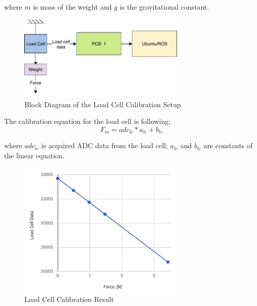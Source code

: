 	where $m$ is mass of the weight and $g$ is the gravitational constant.

\begin{figure}[h]
	\begin{center}
	\includegraphics[width=80mm]{fig/methods/Load_Cell_Calibration.pdf}
	\end{center}
	\vspace{-4mm}
	\caption[Block Diagram of the Load Cell Calibration Setup]
	{Block Diagram of the Load Cell Calibration Setup}
	\label{fig:Calib_setup_LC}
	\vspace{-2mm}
\end{figure}

	The calibration equation for the load cell is following:
\begin{equation}
F_{m} = adc_{lc}*a_{lc} + b_{lc}
\end{equation}

	where $adc_{lc}$ is acquired ADC data from the load cell; $a_{lc}$ and $b_{lc}$ are constants of the linear equation.

\begin{figure}[h]
	\begin{center}
	\includegraphics[width=80mm]{fig/methods/load_cell_calib_data.png}
	\end{center}
	\vspace{-4mm}
	\caption[Load Cell Calibration Result]
	{Load Cell Calibration Result}
	\label{fig:LC_calib_res}
	\vspace{-2mm}
\end{figure}

